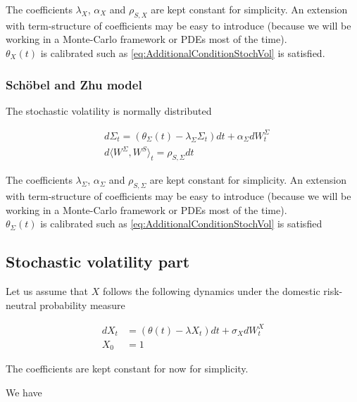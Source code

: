 \documentclass{article}
\begin{document}
\noindent The coefficients $\lambda_X$, $\alpha_X$ and $\rho_{S,X}$ are kept constant for simplicity. An extension with term-structure of coefficients may be easy to introduce (because we will be working in a Monte-Carlo framework or PDEs most of the time).\\

\noindent $\theta_X(t)$ is calibrated such as \ref{eq:AdditionalConditionStochVol} is satisfied.

\subsubsection{Schöbel and Zhu model}
The stochastic volatility is normally distributed

\begin{equation}
	\begin{aligned}
		&d\Sigma_t = \left(\theta_\Sigma(t) - \lambda_\Sigma \Sigma_t\right) dt + \alpha_\Sigma dW_t^\Sigma\\
		&d\langle W^\Sigma, W^S\rangle_t = \rho_{S,\Sigma} dt
	\end{aligned}
\end{equation}

\noindent The coefficients $\lambda_\Sigma$, $\alpha_\Sigma$ and $\rho_{S,\Sigma}$ are kept constant for simplicity. An extension with term-structure of coefficients may be easy to introduce (because we will be working in a Monte-Carlo framework or PDEs most of the time).\\

\noindent $\theta_\Sigma(t)$ is calibrated such as \ref{eq:AdditionalConditionStochVol} is satisfied

\subsection{Stochastic volatility part}
Let us assume that $X$ follows the following dynamics under the domestic risk-neutral probability measure

\begin{equation}
\begin{aligned}
	dX_t &= (\theta(t) - \lambda X_t) dt + \sigma_X dW_t^X\\
	X_0 &= 1
\end{aligned}
\end{equation}

\noindent The coefficients are kept constant for now for simplicity.

\noindent We have 
\end{document}
